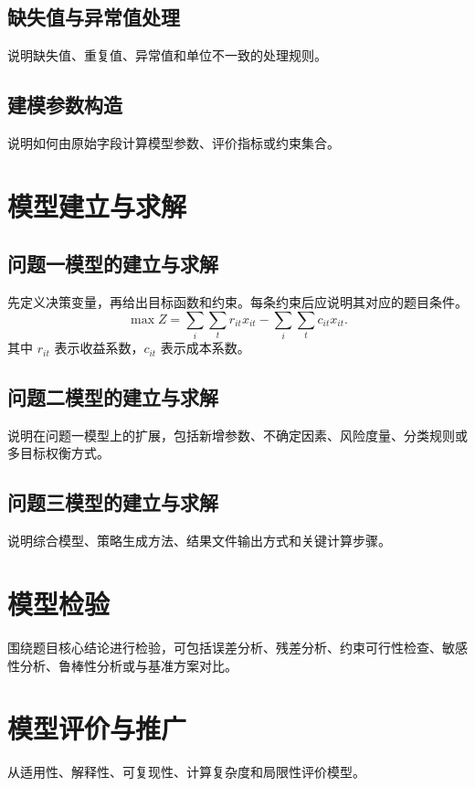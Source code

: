 \documentclass[withoutpreface,bwprint]{cumcmthesis}
\begin{document}
\subsection{缺失值与异常值处理}
说明缺失值、重复值、异常值和单位不一致的处理规则。

\subsection{建模参数构造}
说明如何由原始字段计算模型参数、评价指标或约束集合。

\section{模型建立与求解}
\subsection{问题一模型的建立与求解}
先定义决策变量，再给出目标函数和约束。每条约束后应说明其对应的题目条件。
\begin{equation}
  \max Z = \sum_{i}\sum_t r_{it}x_{it} - \sum_i\sum_t c_{it}x_{it}.
\end{equation}
其中 $r_{it}$ 表示收益系数，$c_{it}$ 表示成本系数。

\subsection{问题二模型的建立与求解}
说明在问题一模型上的扩展，包括新增参数、不确定因素、风险度量、分类规则或多目标权衡方式。

\subsection{问题三模型的建立与求解}
说明综合模型、策略生成方法、结果文件输出方式和关键计算步骤。

\section{模型检验}
围绕题目核心结论进行检验，可包括误差分析、残差分析、约束可行性检查、敏感性分析、鲁棒性分析或与基准方案对比。

\section{模型评价与推广}
从适用性、解释性、可复现性、计算复杂度和局限性评价模型。



\end{document}
